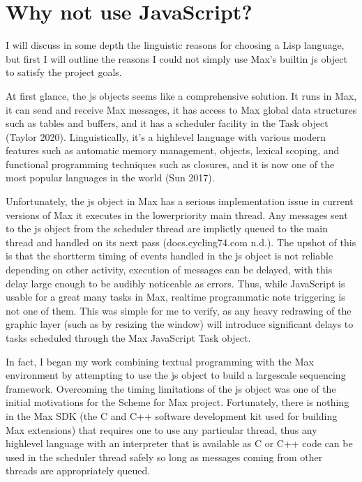 \documentclass[letterpaper,10pt,english]{sphinxmanual}
\begin{document}
\section{Why not use JavaScript?}
\label{\detokenize{design:why-not-use-javascript}}
\sphinxAtStartPar
I will discuss in some depth the linguistic reasons for choosing a Lisp language, but first I will outline the
reasons I could not simply use Max’s built\sphinxhyphen{}in js object to satisfy the project goals.

\sphinxAtStartPar
At first glance, the js objects seems like a comprehensive solution.
It runs in Max, it can send and receive Max messages, it has access to Max global data structures such as tables and buffers,
and it has a scheduler facility in the Task object (Taylor 2020).
Linguistically, it’s a high\sphinxhyphen{}level language with various modern features such as automatic memory management,
objects, lexical scoping, and functional programming techniques such as closures, and it is now one of the most popular
languages in the world (Sun 2017).

\sphinxAtStartPar
Unfortunately, the js object in Max has a serious implementation issue \sphinxhyphen{} in current versions of Max it  executes in the
lower\sphinxhyphen{}priority main thread.  Any messages sent to the js object from the scheduler thread are implictly queued to the
main thread and handled on its next pass (docs.cycling74.com n.d.).
The upshot of this is that the short\sphinxhyphen{}term timing of events handled in the js object is not reliable \sphinxhyphen{}
depending on other activity, execution of messages can be delayed, with this delay large enough to be audibly noticeable as errors.
Thus, while JavaScript is usable for a great many tasks in Max, realtime programmatic note triggering is not one of them.
This was simple for me to verify, as any heavy redrawing of the graphic layer (such as by resizing the window) will
introduce significant delays to tasks scheduled through the Max JavaScript Task object.

\sphinxAtStartPar
In fact, I began my work combining textual programming with the Max environment by attempting to use the js object
to build a large\sphinxhyphen{}scale sequencing framework.
Overcoming the timing limitations of the js object was one of the initial motivations for the Scheme for Max project.
Fortunately, there is nothing in the Max SDK (the C and C++ software development kit used for building Max extensions) that requires
one to use any particular thread, thus any high\sphinxhyphen{}level language with an interpreter that is available as C or C++ code
can be used in the scheduler thread safely so long as messages coming from other threads are appropriately queued.
\end{document}
